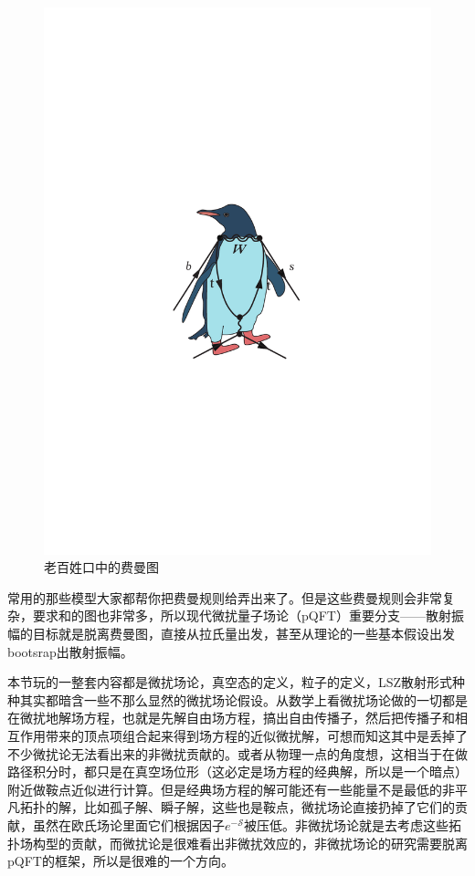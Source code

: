 	\begin{figure}[H]
		\centering
		\includegraphics[scale=0.3]{figs/penguin.pdf}
		\caption{老百姓口中的费曼图}
	\end{figure}
	
	常用的那些模型大家都帮你把费曼规则给弄出来了。但是这些费曼规则会非常复杂，要求和的图也非常多，所以现代微扰量子场论（pQFT）重要分支——散射振幅的目标就是脱离费曼图，直接从拉氏量出发，甚至从理论的一些基本假设出发bootsrap出散射振幅。
	\begin{remark}
		本节玩的一整套内容都是微扰场论，真空态的定义，粒子的定义，LSZ散射形式种种其实都暗含一些不那么显然的微扰场论假设。从数学上看微扰场论做的一切都是在微扰地解场方程，也就是先解自由场方程，搞出自由传播子，然后把传播子和相互作用带来的顶点项组合起来得到场方程的近似微扰解，可想而知这其中是丢掉了不少微扰论无法看出来的非微扰贡献的。或者从物理一点的角度想，这相当于在做路径积分时，都只是在真空场位形（这必定是场方程的经典解，所以是一个暗点）附近做鞍点近似进行计算。但是经典场方程的解可能还有一些能量不是最低的非平凡拓扑的解，比如孤子解、瞬子解，这些也是鞍点，微扰场论直接扔掉了它们的贡献，虽然在欧氏场论里面它们根据因子$e^{-\mathcal{S}}$被压低。非微扰场论就是去考虑这些拓扑场构型的贡献，而微扰论是很难看出非微扰效应的，非微扰场论的研究需要脱离pQFT的框架，所以是很难的一个方向。
	\end{remark}
